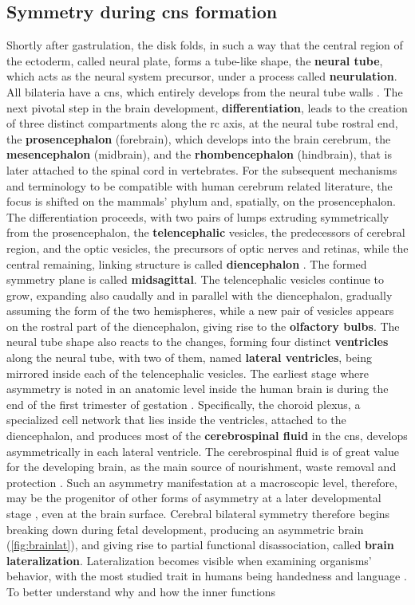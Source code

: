 \subsection{Symmetry during \acs{cns} formation}
Shortly after gastrulation, the disk folds, in such a way that the central region of the ectoderm, called neural plate, forms a tube-like shape, the \textbf{neural tube}, which acts as the neural system precursor, under a process called \textbf{neurulation}. All bilateria have a \acf{cns}, which entirely develops from the neural tube walls \cite{F.Bear2016a}. The next pivotal step in the brain development, \textbf{differentiation}, leads to the creation of three distinct compartments along the \ac{rc} axis, at the neural tube rostral end, the \textbf{prosencephalon} (forebrain), which develops into the brain cerebrum, the \textbf{mesencephalon} (midbrain), and the \textbf{rhombencephalon} (hindbrain), that is later attached to the spinal cord in vertebrates. For the subsequent mechanisms and terminology to be compatible with human cerebrum related literature, the focus is shifted on the mammals' phylum and, spatially, on the prosencephalon. The differentiation proceeds, with two pairs of lumps extruding symmetrically from the prosencephalon, the \textbf{telencephalic} vesicles, the predecessors of cerebral region, and the optic vesicles, the precursors of optic nerves and retinas, while the central remaining, linking structure is called \textbf{diencephalon} \cite{F.Bear2016b}. The formed symmetry plane is called \textbf{midsagittal}. The telencephalic vesicles continue to grow, expanding also caudally and in parallel with the diencephalon, gradually assuming the form of the two hemispheres, while a new pair of vesicles appears on the rostral part of the diencephalon, giving rise to the \textbf{olfactory bulbs}. The neural tube shape also reacts to the changes, forming four distinct \textbf{ventricles} along the neural tube, with two of them, named \textbf{lateral ventricles}, being mirrored inside each of the telencephalic vesicles. The earliest stage where asymmetry is noted in an anatomic level inside the human brain is during the end of the first trimester of gestation \cite{Abu-Rustum2013}. Specifically, the choroid plexus, a specialized cell network that lies inside the ventricles, attached to the diencephalon, and produces most of the \textbf{cerebrospinal fluid} in the \ac{cns},  develops asymmetrically in each lateral ventricle. The cerebrospinal fluid is of great value for the developing brain, as the main source of nourishment, waste removal and protection \cite{Telano2021}. Such an asymmetry manifestation at a macroscopic level, therefore, may be the progenitor of other forms of asymmetry at a later developmental stage \cite{Schmitz2019}, even at the brain surface. Cerebral bilateral symmetry therefore begins breaking down during fetal development, producing an asymmetric brain (\autoref{fig:brainlat}), and giving rise to partial functional disassociation, called \textbf{brain lateralization}. Lateralization becomes visible when examining organisms' behavior, with the most studied trait in humans being handedness and language \cite{Schmitz2019,Corballis2009}. To better understand why and how the inner functions 